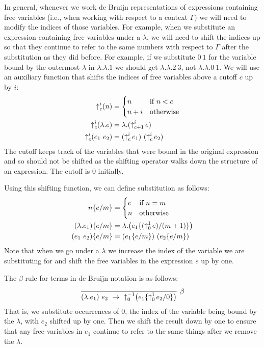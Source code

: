 In general, whenever we work de Bruijn representations of expressions containing free variables
(i.e., when working with respect to a context $\Gamma$) we will need to modify the indices of those
variables. For example, when we substitute an expression containing free variables under a
$\lambda$, we will need to shift the indices up so that they continue to refer to the same numbers
with respect to $\Gamma$ after the substitution as they did before. For example, if we substitute
$0\ 1$ for the variable bound by the outermost $\lambda$ in $\lambda.\lambda.1$ we should get
$\lambda.\lambda.2\ 3$, not $\lambda.\lambda.0\ 1$. We will use an auxiliary function that shifts
the indices of free variables above a cutoff $c$ up by $i$:
\begin{align*}
  {\uparrow}^{i}_{c}(n)&=\begin{cases} n & \text{if } n<c\\ n+i & \text{otherwise}\end{cases}\\
  {\uparrow}^{i}_{c}(\lambda.e)&=\lambda.({{\uparrow}^{i}_{c+1}}\,e)\\
  {\uparrow}^{i}_{c}(e_1\ e_2)&=({{\uparrow}^{i}_{c}}\,e_1)\ ({{\uparrow}^{i}_{c}}\,e_2)
\end{align*}
The cutoff keeps track of the variables that were bound in the original expression and so should
not be shifted as the shifting operator walks down the structure of an expression. The cutoff is
$0$ initially.

Using this shifting function, we can define substitution as follows:
\begin{align*}
  n\{e/m\}&=\begin{cases} e & \text{if } n=m\\ n & \text{otherwise}\end{cases}\\
  (\lambda.e_1)\{e/m\}&=\lambda.\big(e_1\{({{\uparrow}^{1}_{0}}\,e)/(m+1)\}\big)\\
  (e_1\ e_2)\{e/m\}&=(e_1\{e/m\})\ (e_2\{e/m\})
\end{align*}
Note that when we go under a $\lambda$ we increase the index of the variable we are substituting for
and shift the free variables in the expression $e$ up by one.

The $\beta$ rule for terms in de Bruijn notation is as follows:
\[
  \infr{}{(\lambda.e_1)\ e_2\ \to\ {\sh{-1}{0}}\big(e_1\{{\sh{1}{0}}\,e_2/0\}\big)}{$\beta$}
\]
That is, we substitute occurrences of $0$, the index of the variable being bound by the $\lambda$,
with $e_2$ shifted up by one. Then we shift the result down by one to ensure that any free
variables in $e_1$ continue to refer to the same things after we remove the $\lambda$.

